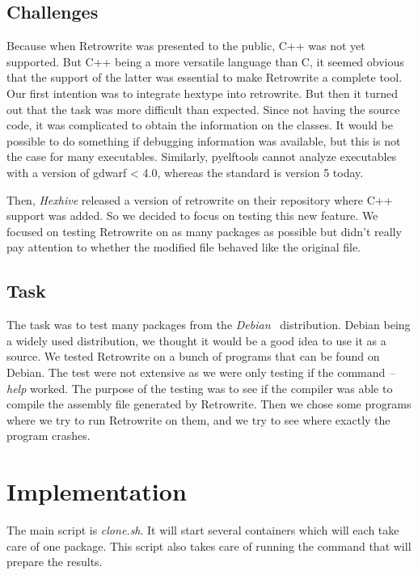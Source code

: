 \documentclass[a4paper,11pt,oneside]{report}
\newcommand{\sysname}{Retrowrite\xspace}
\begin{document}
\section{Challenges}
Because when Retrowrite was presented to the public, C++ was not yet supported.
But C++ being a more versatile language than C, it seemed obvious that the
support of the latter was essential to make Retrowrite a complete tool. Our
first intention was to integrate hextype into retrowrite. But then it turned
out that the task was more difficult than expected. Since not having the source
code, it was complicated to obtain the information on the classes. It would be
possible to do something if debugging information was available, but this is
not the case for many executables. Similarly, pyelftools cannot analyze
executables with a version of gdwarf < 4.0, whereas the standard is version 5
today.

Then, \textit{Hexhive} released a version of retrowrite on their repository
where C++ support was added. So we decided to focus on testing this new
feature.
We focused on testing \sysname on as many packages as possible but didn't
really pay attention to whether the modified file behaved like the original
file.

\section{Task}
The task was to test many packages from the
\textit{Debian}~\cite{debian} distribution. Debian being a widely used
distribution, we thought it would be a good idea to use it as a source. 
We tested Retrowrite on a bunch of programs that can be found on Debian.
The test were not extensive as we were only testing if the command
\textit{--help} worked. The purpose of the testing was to see if the compiler
was able to compile the assembly file generated by \sysname.
Then we chose some programs where we try to run \sysname on them, and we try to
see where exactly the program crashes.


\chapter{Implementation}

The main script is \textit{clone.sh}. It will start several containers which will
each take care of one package. This script also takes care of running the
command that will prepare the results.
\end{document}
